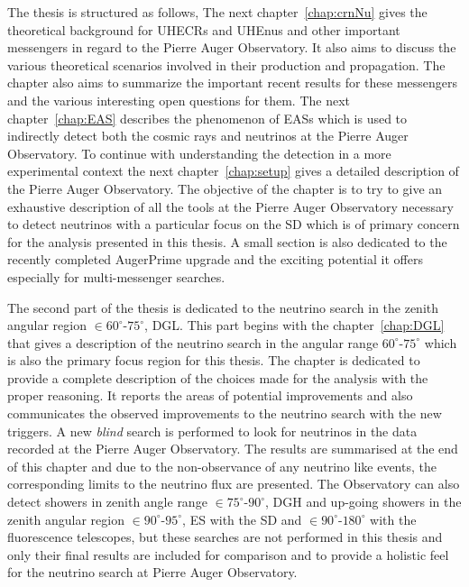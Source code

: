 The thesis is structured as follows, The next chapter~\ref{chap:crnNu} gives the theoretical background for \glspl{UHECR} and \glspl{UHEnu} and other important messengers in regard to the Pierre Auger Observatory. It also aims to discuss the various theoretical scenarios involved in their production and propagation. The chapter also aims to summarize the important recent results for these messengers and the various interesting open questions for them. The next chapter~\ref{chap:EAS} describes the phenomenon of \glspl{EAS} which is used to indirectly detect both the cosmic rays and neutrinos at the Pierre Auger Observatory. To continue with understanding the detection in a more experimental context the next chapter~\ref{chap:setup} gives a detailed description of the Pierre Auger Observatory. The objective of the chapter is to try to give an exhaustive description of all the tools at the Pierre Auger Observatory necessary to detect neutrinos with a particular focus on the \gls{SD} which is of primary concern for the analysis presented in this thesis. A small section is also dedicated to the recently completed AugerPrime upgrade and the exciting potential it offers especially for multi-messenger searches. 

The second part of the thesis is dedicated to the neutrino search in the zenith angular region $ \in 60^\circ$-$75^\circ$, \gls{DGL}. This part begins with the chapter~\ref{chap:DGL} that gives a description of the neutrino search in the angular range $60^\circ$-$75^\circ$ which is also the primary focus region for this thesis. The chapter is dedicated to provide a complete description of the choices made for the analysis with the proper reasoning. It reports the areas of potential improvements and also communicates the observed improvements to the neutrino search with the new triggers. A new \textit{blind} search is performed to look for neutrinos in the data recorded at the Pierre Auger Observatory. The results are summarised at the end of this chapter and due to the non-observance of any neutrino like events, the corresponding limits to the neutrino flux are presented. The Observatory can also detect showers in zenith angle range $\in 75^\circ$-$90^\circ$, \gls{DGH} and up-going showers in the zenith angular region $ \in 90^\circ$-$95^\circ$, \gls{ES} with the \gls{SD} and $\in 90^\circ$-$180^\circ$ with the fluorescence telescopes, but these searches are not performed in this thesis and only their final results are included for comparison and to provide a holistic feel for the neutrino search at Pierre Auger Observatory.

